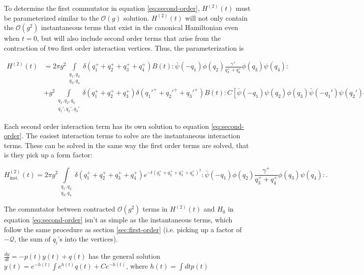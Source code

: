 To determine the first commutator in equation \ref{eq:second-order}, $H^{(2)}(t)$ must be parameterized similar to the $\mathcal{O}(g)$ solution. 
$H^{(2)}(t)$ will not only contain the $\mathcal{O}(g^2)$ instantaneous terms that exist in the canonical Hamiltonian even when $t = 0$, but will also include second order terms that arise from the contraction of two first order interaction vertices. 
Thus, the parameterization is

\begin{align}
    H^{(2)}(t) &= 2\pi g^2 \int\limits_{\substack{q_1, q_2\\ q_3, q_4}} \delta \left(q_1^+ + q_2^+ + q_3^+ + q_4^+ \right) B(t):\bar \psi(-q_1) \phi(q_2)\frac{\gamma^+}{q_3^+ + q_4^+} \phi(q_3) \psi(q_4): \\ \nonumber
    &+ g^2 \int\limits_{\substack{q_1, q_2, q_3\\ q_1', q_2', q_3'}} \delta \left(q_1^+ + q_2^+ + q_3^+ \right) \delta \left(q_1'^+ + q_2'^+ + q_3'^+ \right)B(t):C\left[\bar \psi(-q_1)\psi(q_2)\phi(q_3)\bar \psi(-q_1')\psi(q_2')\phi(q_3') \right]:.
\end{align}

Each second order interaction term has its own solution to equation \ref{eq:second-order}. 
The easiest interaction terms to solve are the instantaneous interaction terms. 
These can be solved in the same way the first order terms are solved, that is they pick up a form factor:

$$
H^{(2)}_{\text{inst.}}(t) = 2\pi g^2 \int\limits_{\substack{q_1, q_2\\ q_3, q_4}} \delta \left(q_1^+ + q_2^+ + q_3^+ + q_4^+ \right) e^{-t \left(q_1^+ + q_2^+ + q_3^+ + q_4^+ \right)^2}:\bar \psi(-q_1) \phi(q_2)\frac{\gamma^+}{q_3^+ + q_4^+} \phi(q_3) \psi(q_4):.
$$

The commutator between contracted $\mathcal{O}(g^2)$ terms in $H^{(2)}(t)$ and $H_0$ in equation \ref{eq:second-order} isn't as simple as the instantaneous terms, which follow the same procedure as section \ref{sec:first-order} (i.e. picking up a factor of $-\mathcal{Q}$, the sum of $q_i$'s into the vertices).

$\frac{dy}{dt} = -p(t)y(t) + q(t)$ has the general solution $y(t) = e^{-h(t)}\int e^{h(t)}q(t) + Ce^{-h(t)}$, where $h(t) = \int dt p(t)$
